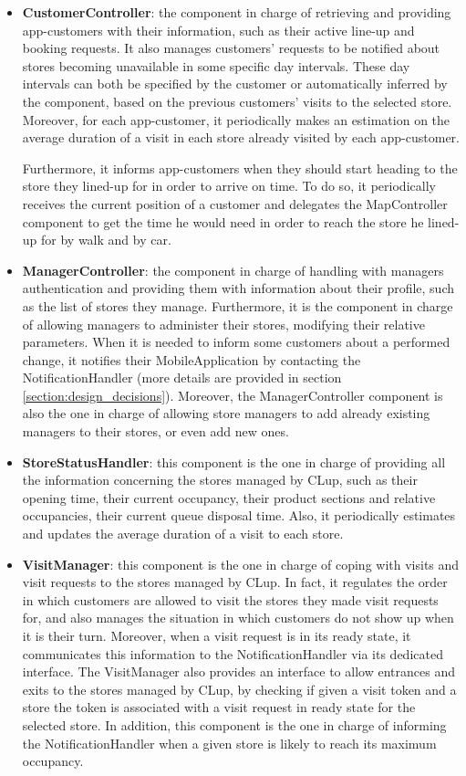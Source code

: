 \documentclass[a4paper,oneside,11pt]{book}
\begin{document}
\begin{itemize}
\begin{itemize}
        \end{itemize}   
        \item \textbf{CustomerController}: the component in charge of retrieving and providing app-customers with their information, such as their active line-up and booking requests. It also manages customers’ requests to be notified about stores becoming unavailable in some specific day intervals. These day intervals can both be specified by the customer or automatically inferred by the component, based on the previous customers’ visits to the selected store. Moreover, for each app-customer, it periodically makes an estimation on the average duration of a visit in each store already visited by each app-customer.\par
        Furthermore, it informs app-customers when they should start heading to the store they lined-up for in order to arrive on time. To do so, it periodically receives the current position of a customer and delegates the MapController component to get the time he would need in order to reach the store he lined-up for by walk and by car.
        \item \textbf{ManagerController}: the component in charge of handling with managers authentication and providing them with information about their profile, such as the list of stores they manage. Furthermore, it is the component in charge of allowing managers to administer their stores, modifying their relative parameters. When it is needed to inform some customers about a performed change, it notifies their MobileApplication by contacting the NotificationHandler (more details are provided in section \ref{section:design_decisions}). Moreover, the ManagerController component is also the one in charge of allowing store managers to add already existing managers to their stores, or even add new ones.
        \item \textbf{StoreStatusHandler}: this component is the one in charge of providing all the information concerning the stores managed by CLup, such as their opening time, their current occupancy, their product sections and relative occupancies, their current queue disposal time. Also, it periodically estimates and updates the average duration of a visit to each store.
        \item \textbf{VisitManager}: this component is the one in charge of coping with visits and visit requests to the stores managed by CLup. In fact, it regulates the order in which customers are allowed to visit the stores they made visit requests for, and also manages the situation in which customers do not show up when it is their turn. Moreover, when a visit request is in its ready state, it communicates this information to the NotificationHandler via its dedicated interface. The VisitManager also provides an interface to allow entrances and exits to the stores managed by CLup, by checking if given a visit token and a store the token is associated with a visit request in ready state for the selected store. In addition, this component is the one in charge of informing the NotificationHandler when a given store is likely to reach its maximum occupancy. 

\end{itemize}
\end{document}

